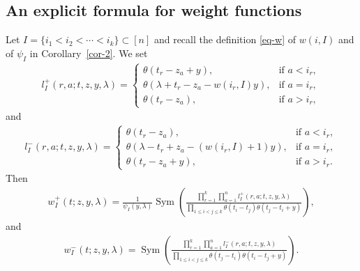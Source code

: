 \documentclass[pdftex]{sigma}
\numberwithin{equation}{section}
\begin{document}
\subsection{An explicit formula for weight functions}\label{ss-expli}
Let $I=\{i_1<i_2<\cdots<i_k\}\subset [n]$ and recall the definition \eqref{eq-w} of $w(i,I)$ and of $\psi_I$ in Corollary~\ref{cor-2}. We set
\begin{gather*}
 l^+_I(r,a;t,z,y,\lambda) =
 \begin{cases}
 \theta(t_r-z_a+y),& \text{if $a<i_r$}, \\
 \theta(\lambda+t_r-z_a-w(i_r,I)y), & \text{if $a=i_r$}, \\
 \theta(t_r-z_a), & \text{if $a>i_r$},
 \end{cases}
\end{gather*}
and
\begin{gather*}
 l^-_I(r,a;t,z,y,\lambda) =
 \begin{cases}
 \theta(t_r-z_a),& \text{if $a<i_r$}, \\
 \theta(\lambda-t_r+z_a-(w(i_r,I)+1)y), & \text{if $a=i_r$}, \\
 \theta(t_r-z_a+y), & \text{if $a>i_r$}.
 \end{cases}
\end{gather*}
Then
\begin{gather*}
 w^+_I(t;z,y,\lambda)=\frac{1}{\psi_I(y,\lambda)}\operatorname{Sym} \left( \frac { \prod\limits_{r=1}^k\prod\limits_{a=1}^nl^+_I(r,a;t,z,y,\lambda) } {\prod\limits_{1\leq i<j\leq k}\theta(t_i-t_j)\theta(t_j-t_i+y)}\right),
\end{gather*}
and
\begin{gather*}
 w^-_I(t;z,y,\lambda)=\operatorname{Sym}\left( \frac { \prod\limits_{r=1}^k\prod\limits_{a=1}^nl^-_I(r,a;t,z,y,\lambda) } {\prod\limits_{1\leq i<j\leq k}\theta(t_j-t_i)\theta(t_i-t_j+y)}\right).
\end{gather*}
\end{document}
